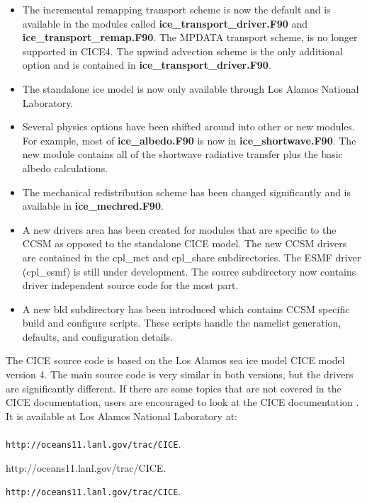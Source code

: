 \begin{itemize}

\item The incremental remapping transport scheme is now the default and is
      available in the modules called {\bf ice\_transport\_driver.F90} and 
      {\bf ice\_transport\_remap.F90}.  The MPDATA transport scheme,
      is no longer supported in CICE4. The upwind advection scheme is the
      only additional option and is contained in 
      {\bf ice\_transport\_driver.F90}.

\item The standalone ice model is now only available through Los Alamos National
      Laboratory.

\item Several physics options have been shifted around into other or new
      modules. For example, most of {\bf ice\_albedo.F90} is now in 
      {\bf ice\_shortwave.F90}. The new module contains all of the shortwave
      radiative transfer plus the basic albedo calculations.

\item The mechanical redistribution scheme has been changed significantly and
      is available in {\bf ice\_mechred.F90}.

\item A new drivers area has been created for modules that are specific
      to the CCSM as opposed to the standalone CICE model. The new CCSM
      drivers are contained in the cpl\_mct and cpl\_share subdirectories.
      The ESMF driver (cpl\_esmf) is still under development. The source
      subdirectory now contains driver independent source code for the
      most part.

\item A new bld subdirectory has been introduced which contains CCSM
      specific build and configure scripts. These scripts handle the
      namelist generation, defaults, and configuration details.

\end{itemize}

The CICE source code is based on the Los Alamos sea ice model CICE model version 4.  The main source code is very similar in both versions, but the drivers are significantly different.  If there are some topics that are not covered in the CICE documentation, users are encouraged to look at the CICE documentation \cite{cice08}.  It is available at Los Alamos National Laboratory at: \\
\\

\ifpdf
                    {\tt http://oceans11.lanl.gov/trac/CICE}.
\else
\begin{htmlonly}
                    {http://oceans11.lanl.gov/trac/CICE}.
\end{htmlonly}
\begin{latexonly}
                    {\tt http://oceans11.lanl.gov/trac/CICE}.
\end{latexonly}
\fi
